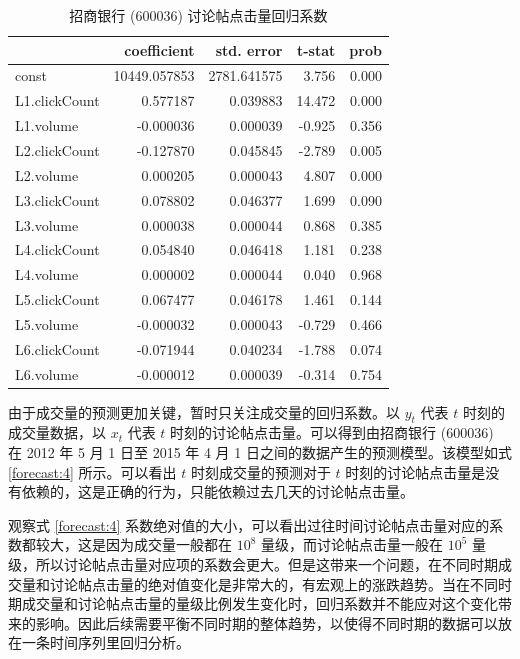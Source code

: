 \begin{table}
  \centering
  \caption{招商银行 (600036) 讨论帖点击量回归系数}
  \label{forecast:3}
  \begin{tabular}{lrrrr}
    \toprule
    & coefficient & std. error & t-stat & prob \\
    \midrule
    const & 10449.057853 & 2781.641575 & 3.756 & 0.000 \\
    L1.clickCount & 0.577187 & 0.039883 & 14.472 & 0.000 \\
    L1.volume & -0.000036 & 0.000039 & -0.925 & 0.356 \\
    L2.clickCount & -0.127870 & 0.045845 & -2.789 & 0.005 \\
    L2.volume & 0.000205 & 0.000043 & 4.807 & 0.000 \\
    L3.clickCount & 0.078802 & 0.046377 & 1.699 & 0.090 \\
    L3.volume & 0.000038 & 0.000044 & 0.868 & 0.385 \\
    L4.clickCount & 0.054840 & 0.046418 & 1.181 & 0.238 \\
    L4.volume & 0.000002 & 0.000044 & 0.040 & 0.968 \\
    L5.clickCount & 0.067477 & 0.046178 & 1.461 & 0.144 \\
    L5.volume & -0.000032 & 0.000043 & -0.729 & 0.466 \\
    L6.clickCount & -0.071944 & 0.040234 & -1.788 & 0.074 \\
    L6.volume & -0.000012 & 0.000039 & -0.314 & 0.754 \\
    \bottomrule
  \end{tabular}
\end{table}

由于成交量的预测更加关键，暂时只关注成交量的回归系数。以 $y_{t}$ 代表 $t$ 时刻的成交量数据，以 $x_{t}$ 代表 $t$ 时刻的讨论帖点击量。可以得到由招商银行 (600036) 在 2012 年 5 月 1 日至 2015 年 4 月 1 日之间的数据产生的预测模型。该模型如式 \ref{forecast:4} 所示。可以看出 $t$ 时刻成交量的预测对于 $t$ 时刻的讨论帖点击量是没有依赖的，这是正确的行为，只能依赖过去几天的讨论帖点击量。

观察式 \ref{forecast:4} 系数绝对值的大小，可以看出过往时间讨论帖点击量对应的系数都较大，这是因为成交量一般都在 $10^{8}$ 量级，而讨论帖点击量一般在 $10^{5}$ 量级，所以讨论帖点击量对应项的系数会更大。但是这带来一个问题，在不同时期成交量和讨论帖点击量的绝对值变化是非常大的，有宏观上的涨跌趋势。当在不同时期成交量和讨论帖点击量的量级比例发生变化时，回归系数并不能应对这个变化带来的影响。因此后续需要平衡不同时期的整体趋势，以使得不同时期的数据可以放在一条时间序列里回归分析。

